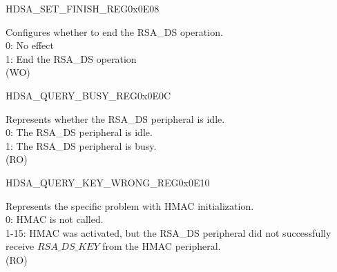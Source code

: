 \begin{register}{H}{DSA\_SET\_FINISH\_REG}{0x0E08}\label{regdesc:DSASETFINISHREG}
%
%
\regnewline%
\begin{regdesc}\begin{reglist}
\item [DSA\_SET\_FINISH] Configures whether to end the RSA\_DS operation. \\
0: No effect\\
1: End the RSA\_DS operation\\
(WO)
\end{reglist}\end{regdesc}
\end{register}


\begin{register}{H}{DSA\_QUERY\_BUSY\_REG}{0x0E0C}\label{regdesc:DSAQUERYBUSYREG}
%
%
\regnewline%
\begin{regdesc}\begin{reglist}
\item [DSA\_QUERY\_BUSY] Represents whether the RSA\_DS peripheral is idle.\\
0: The RSA\_DS peripheral is idle.\\
1: The RSA\_DS peripheral is busy.\\
(RO)
\end{reglist}\end{regdesc}
\end{register}


\begin{register}{H}{DSA\_QUERY\_KEY\_WRONG\_REG}{0x0E10}\label{regdesc:DSAQUERYKEYWRONGREG}
%
%
\regnewline%
\begin{regdesc}\begin{reglist}
\item [DSA\_QUERY\_KEY\_WRONG] Represents the specific problem with HMAC initialization.\\
0: HMAC is not called.\\
1-15: HMAC was activated, but the RSA\_DS peripheral did not successfully receive \begin{math}RSA\_DS\_KEY\end{math} from the HMAC peripheral.\\
(RO)
\end{reglist}\end{regdesc}
\end{register}


